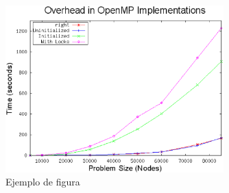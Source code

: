 \begin{figure}[!th]
\begin{center}
\includegraphics[width=0.75\textwidth]{images/figura1.eps}
\caption{Ejemplo de figura}
\label{fig:1}
\end{center}
\end{figure}





